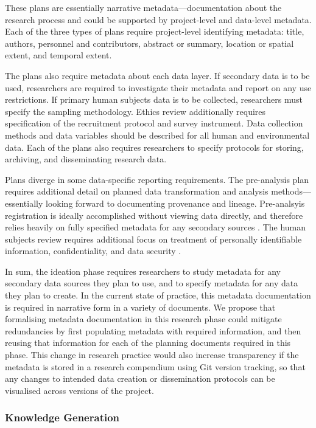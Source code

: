\documentclass{isprs} %
\begin{document}
These plans are essentially narrative metadata---documentation about the research process and could be supported by project-level and data-level metadata. 
Each of the three types of plans require project-level identifying metadata: title, authors, personnel and contributors, abstract or summary, location or spatial extent, and temporal extent. 

The plans also require metadata about each data layer. 
If secondary data is to be used, researchers are required to investigate their metadata and report on any use restrictions. 
If primary human subjects data is to be collected, researchers must specify the sampling methodology. 
Ethics review additionally requires specification of the recruitment protocol and survey instrument. 
Data collection methods and data variables should be described for all human and environmental data. 
Each of the plans also requires researchers to specify protocols for storing, archiving, and disseminating research data. 

Plans diverge in some data-specific reporting requirements. 
The pre-analysis plan requires additional detail on planned data transformation and analysis methods---essentially looking forward to documenting provenance and lineage. 
Pre-analsyis registration is ideally accomplished without viewing data directly, and therefore relies heavily on fully specified metadata for any secondary sources \citep{Nosek2018}. 
The human subjects review requires additional focus on treatment of personally identifiable information, confidentiality, and data security \citep{DHEW1978}. 

In sum, the ideation phase requires researchers to study metadata for any secondary data sources they plan to use, and to specify metadata for any data they plan to create.
In the current state of practice, this metadata documentation is required in narrative form in a variety of documents.
We propose that formalising metadata documentation in this research phase could mitigate redundancies by first populating metadata with required information, and then reusing that information for each of the planning documents required in this phase.
This change in research practice would also increase transparency if the metadata is stored in a research compendium using Git version tracking, so that any changes to intended data creation or dissemination protocols can be visualised across versions of the project.  

\subsubsection{Knowledge Generation}
\end{document}
